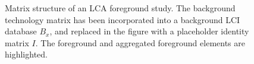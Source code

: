 \begin{figure}[t]
  \begin{center}
    
    \caption{Matrix structure of an LCA foreground study.  The background technology matrix has been incorporated into a background LCI database $B_x$, and replaced in the figure with a placeholder identity matrix $I$.  The foreground and aggregated foreground elements are highlighted.}
    \label{fig:foreground}
  \end{center}
\end{figure}
